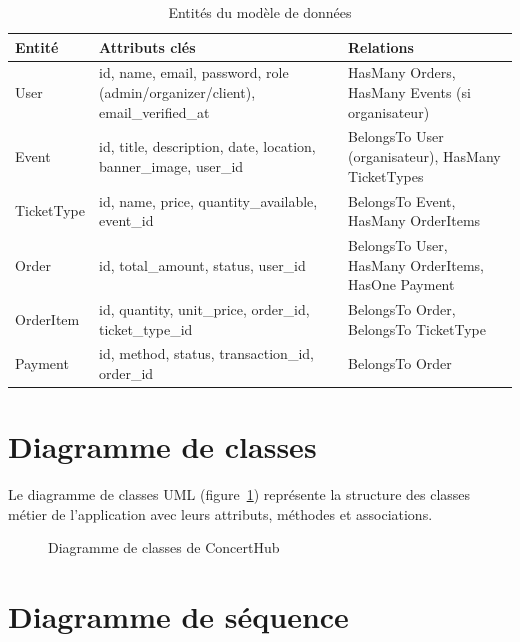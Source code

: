 \documentclass[a4paper,12pt,twoside]{report}
\begin{document}
\begin{table}[!h]
    \renewcommand{\tablename}{Tableau}
    \centering
    \caption{Entités du modèle de données}
    \label{tab:entites}
    \smallskip
    \begin{tabular}{|p{2cm}|p{5.5cm}|p{5.5cm}|}
        \hline
        \textbf{Entité} & \textbf{Attributs clés} & \textbf{Relations} \\
        \hline \hline
        User & id, name, email, password, role (admin/organizer/client), email\_verified\_at & HasMany Orders, HasMany Events (si organisateur) \\
        \hline
        Event & id, title, description, date, location, banner\_image, user\_id & BelongsTo User (organisateur), HasMany TicketTypes \\
        \hline
        TicketType & id, name, price, quantity\_available, event\_id & BelongsTo Event, HasMany OrderItems \\
        \hline
        Order & id, total\_amount, status, user\_id & BelongsTo User, HasMany OrderItems, HasOne Payment \\
        \hline
        OrderItem & id, quantity, unit\_price, order\_id, ticket\_type\_id & BelongsTo Order, BelongsTo TicketType \\
        \hline
        Payment & id, method, status, transaction\_id, order\_id & BelongsTo Order \\
        \hline
    \end{tabular}
\end{table}

\section{Diagramme de classes}

Le diagramme de classes UML (figure~\ref{fig:classes}) représente la structure des classes métier de l'application avec leurs attributs, méthodes et associations.

\begin{figure}[!h]
    \centering
    \caption{Diagramme de classes de ConcertHub}
    \label{fig:classes}
\end{figure}

\section{Diagramme de séquence}
\end{document}
